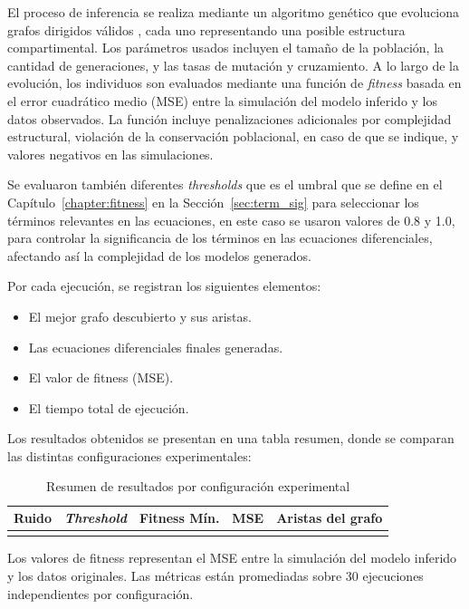 El proceso de inferencia se realiza mediante un algoritmo genético que evoluciona grafos dirigidos válidos , cada uno representando una posible estructura compartimental. Los parámetros usados incluyen el tamaño de la población, la cantidad de generaciones, y las tasas de mutación y cruzamiento. A lo largo de la evolución, los individuos son evaluados mediante una función de \textit{fitness} basada en el error cuadrático medio (MSE) entre la simulación del modelo inferido y los datos observados. La función incluye penalizaciones adicionales por complejidad estructural, violación de la conservación poblacional, en caso de que se indique, y valores negativos en las simulaciones.

Se evaluaron también diferentes \textit{thresholds} que es el umbral que se define en el Cap\'itulo~\ref{chapter:fitness} en la Secci\'on~\ref{sec:term_sig} para seleccionar los t\'erminos relevantes en las ecuaciones, en este caso se usaron valores de 0.8 y 1.0, para controlar la significancia de los términos en las ecuaciones diferenciales, afectando así la complejidad de los modelos generados.

Por cada ejecución, se registran los siguientes elementos:
\begin{itemize}
    \item El mejor grafo descubierto y sus aristas.
    \item Las ecuaciones diferenciales finales generadas.
    \item El valor de fitness (MSE).
    \item El tiempo total de ejecución.
\end{itemize}

Los resultados obtenidos se presentan en una tabla resumen, donde se comparan las distintas configuraciones experimentales:

\begin{table}[H]
\centering
\caption{Resumen de resultados por configuración experimental}
\begin{tabular}{|c|c|c|c|c|}
\hline
\textbf{Ruido} & \textbf{\textit{Threshold}} & \textbf{Fitness Mín.} & \textbf{MSE} & \textbf{Aristas del grafo} \\
\hline
 &  &  &  &  \\
\hline
\end{tabular}
\label{tab:resultados-experimentales}
\end{table}

\noindent

Los valores de fitness representan el MSE entre la simulación del modelo inferido y los datos originales. Las métricas están promediadas sobre 30 ejecuciones independientes por configuración.

